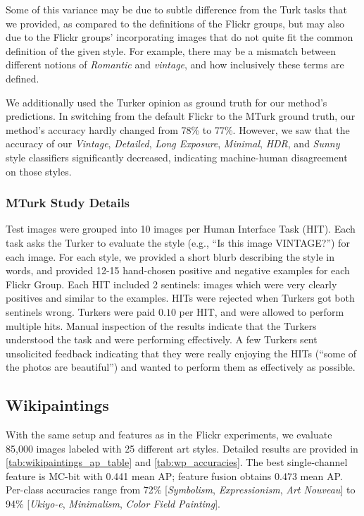 Some of this variance may be due to subtle difference from the Turk tasks that we provided, as compared to the definitions of the Flickr groups, but may also due to the Flickr groups' incorporating images that do not quite fit the common definition of the given style.
For example, there may be a mismatch between different notions of \emph{Romantic} and \emph{vintage}, and how inclusively these terms are defined.

We additionally used the Turker opinion as ground truth for our method's predictions.
In switching from the default Flickr to the MTurk ground truth, our method's accuracy hardly changed from 78\% to 77\%.
However, we saw that the accuracy of our \emph{Vintage}, \emph{Detailed}, \emph{Long Exposure}, \emph{Minimal}, \emph{HDR}, and \emph{Sunny} style classifiers significantly decreased, indicating machine-human disagreement on those styles.

\subsubsection{MTurk Study Details}\label{sec:mech_turk_details}
Test images were grouped into 10 images per Human Interface Task (HIT). Each task asks the Turker to evaluate the style (e.g., ``Is this image VINTAGE?'') for each image.  For each style, we provided a short blurb describing the style in words, and provided 12-15 hand-chosen positive and negative examples for each Flickr Group.
Each HIT included 2 sentinels: images which were very clearly positives and similar to the examples.  HITs were rejected when Turkers got both sentinels wrong.
Turkers were paid $0.10$ per HIT, and were allowed to perform multiple hits.  Manual inspection of the results indicate that the Turkers understood the task and were performing effectively.  A few Turkers sent unsolicited feedback indicating that they were really enjoying the HITs (``some of the photos are beautiful'') and wanted to perform them as effectively as possible.

\subsection{Wikipaintings}
With the same setup and features as in the Flickr experiments, we evaluate 85,000 images labeled with 25 different art styles.
Detailed results are provided in \autoref{tab:wikipaintings_ap_table} and \autoref{tab:wp_accuracies}.
The best single-channel feature is MC-bit with 0.441 mean AP; feature fusion obtains 0.473 mean AP.
Per-class accuracies range from 72\% [\emph{Symbolism}, \emph{Expressionism}, \emph{Art Nouveau}] to 94\% [\emph{Ukiyo-e}, \emph{Minimalism}, \emph{Color Field Painting}].

